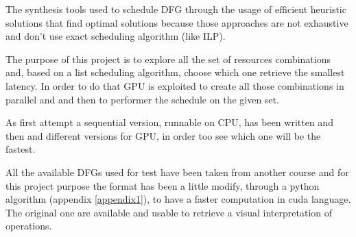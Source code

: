 The synthesis tools used to schedule DFG through the usage of efficient heuristic solutions that find optimal solutions because those approaches are not exhaustive and don't use exact scheduling algorithm (like ILP). 

The purpose of this project is to explore all the set of resources combinations and, based on a list scheduling algorithm, choose which one retrieve the smallest latency. In order to do that GPU is exploited to create all those combinations in parallel and and then to performer the schedule on the given set.

As first attempt a sequential version, runnable on CPU, has been written and then and different versions for GPU, in order too see which one will be the fastest.

All the available DFGs used for test have been taken from another course and for this project purpose the format has been a little modify, through a python algorithm (appendix \ref{appendix1}), to have a faster computation in 
cuda language. The original one are available and usable to retrieve a visual interpretation of operations.






